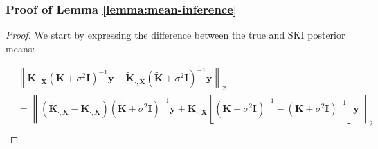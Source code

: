 \subsubsection{Proof of Lemma \ref{lemma:mean-inference}}\label{sec:proof-mean-inference}
\meaninference*
\begin{proof}
        We start by expressing the difference between the true and SKI posterior means:

\begin{align*}
& \left\|\mathbf{K}_{\cdot,\mathbf{X}} \left( \mathbf{K} + \sigma^{2} \mathbf{I} \right)^{-1} \mathbf{y} - \tilde{\mathbf{K}}_{\cdot, \mathbf{X}} \left( \tilde{\mathbf{K}} + \sigma^{2} \mathbf{I} \right)^{-1} \mathbf{y} \right\|_{2} \\
&= \left\| \left( \tilde{\mathbf{K}}_{\cdot, \mathbf{X}} -\mathbf{K}_{\cdot,\mathbf{X}}\right) \left( \tilde{\mathbf{K}} + \sigma^{2} \mathbf{I} \right)^{-1} \mathbf{y} +\mathbf{K}_{\cdot,\mathbf{X}}\left[ \left( \tilde{\mathbf{K}} + \sigma^{2} \mathbf{I} \right)^{-1} - \left(\mathbf{K} + \sigma^{2} \mathbf{I} \right)^{-1} \right] \mathbf{y} \right\|_{2}\\
\end{align*}



\end{proof}
